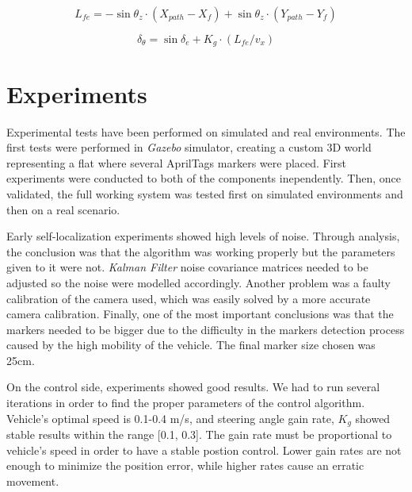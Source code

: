 \documentclass{styles/svproc}
\begin{document}
	\begin{equation}
	L_{fe} = - \sin \theta_{z} \cdot ( X_{path} - X_{f} ) + \sin \theta_{z} \cdot ( Y_{path} - Y_{f} )
	\label{eq:le}
	\end{equation}

	\begin{equation}
	\delta_{\theta} = \sin \delta_{e} +  K_{g} \cdot ( L_{fe} / v_{x} )
	\label{eq:deltatheta}
	\end{equation}

\section{Experiments}

	Experimental tests have been performed on simulated and real environments. The first tests were performed in \textit{Gazebo} simulator, creating a custom 3D world representing a flat where several AprilTags markers were placed. First experiments were conducted to both of the components inependently. Then, once validated, the full working system was tested first on simulated environments and then on a real scenario.
	
	Early self-localization experiments showed high levels of noise. Through analysis, the conclusion was that the algorithm was working properly but the parameters given to it were not. \textit{Kalman Filter} noise covariance matrices needed to be adjusted so the noise were modelled accordingly. Another problem was a faulty calibration of the camera used, which was easily solved by a more accurate camera calibration. Finally, one of the most important conclusions was that the markers needed to be bigger due to the difficulty in the markers detection process caused by the high mobility of the vehicle. The final marker size chosen was 25cm.
	
	On the control side, experiments showed good results. We had to run several iterations in order to find the proper parameters of the control algorithm. Vehicle's optimal speed is 0.1-0.4 m/s, and steering angle gain rate, $ K_{g}$ showed stable results within the range [0.1, 0.3]. The gain rate must be proportional to vehicle's speed in order to have a stable postion control. Lower gain rates are not enough to minimize the position error, while higher rates cause an erratic movement.
	
\end{document}
